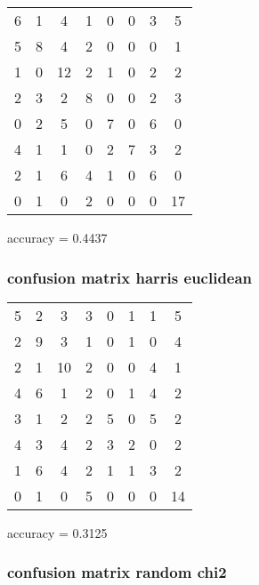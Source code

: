 \documentclass[12pt]{article}
\begin{document}
\begin{tabular}{c c c c c c c c}
6 &     1 &     4 &     1 &     0 &     0 &     3 &     5 \\
5 &     8 &     4 &     2 &     0 &     0 &     0 &     1 \\
1 &     0 &    12 &     2 &     1 &     0 &     2 &     2 \\
2 &     3 &     2 &     8 &     0 &     0 &     2 &     3 \\
0 &     2 &     5 &     0 &     7 &     0 &     6 &     0 \\
4 &     1 &     1 &     0 &     2 &     7 &     3 &     2 \\
2 &     1 &     6 &     4 &     1 &     0 &     6 &     0 \\
0 &     1 &     0 &     2 &     0 &     0 &     0 &    17
\end{tabular}

accuracy = 0.4437


\subsubsection{confusion matrix harris euclidean}

\begin{tabular}{c c c c c c c c}
5 &     2 &     3 &     3 &     0 &     1 &     1 &     5 \\
2 &     9 &     3 &     1 &     0 &     1 &     0 &     4 \\
2 &     1 &    10 &     2 &     0 &     0 &     4 &     1 \\
4 &     6 &     1 &     2 &     0 &     1 &     4 &     2 \\
3 &     1 &     2 &     2 &     5 &     0 &     5 &     2 \\
4 &     3 &     4 &     2 &     3 &     2 &     0 &     2 \\
1 &     6 &     4 &     2 &     1 &     1 &     3 &     2 \\
0 &     1 &     0 &     5 &     0 &     0 &     0 &    14 
\end{tabular}

accuracy = 0.3125

\subsubsection{confusion matrix random chi2}
\end{document}
